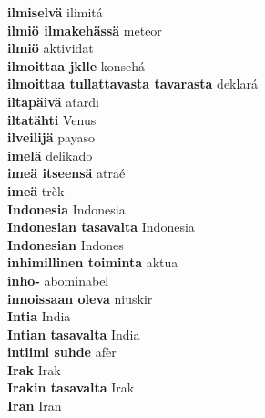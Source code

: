 \textbf{ ilmiselvä  } ilimitá \\
\textbf{ ilmiö ilmakehässä  } meteor \\
\textbf{ ilmiö  } aktividat \\
\textbf{ ilmoittaa jklle  } konsehá \\
\textbf{ ilmoittaa tullattavasta tavarasta  } deklará \\
\textbf{ iltapäivä  } atardi \\
\textbf{ iltatähti  } Venus \\
\textbf{ ilveilijä  } payaso \\
\textbf{ imelä  } delikado \\
\textbf{ imeä itseensä  } atraé \\
\textbf{ imeä  } trèk \\
\textbf{ Indonesia  } Indonesia \\
\textbf{ Indonesian tasavalta  } Indonesia \\
\textbf{ Indonesian  } Indones \\
\textbf{ inhimillinen toiminta  } aktua \\
\textbf{ inho-  } abominabel \\
\textbf{ innoissaan oleva  } niuskir \\
\textbf{ Intia  } India \\
\textbf{ Intian tasavalta  } India \\
\textbf{ intiimi suhde  } afèr \\
\textbf{ Irak  } Irak \\
\textbf{ Irakin tasavalta  } Irak \\
\textbf{ Iran  } Iran \\
